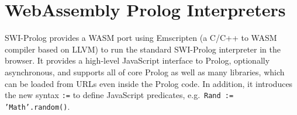 \documentclass{article}
\begin{document}
\section{WebAssembly Prolog Interpreters}

SWI-Prolog provides a WASM port \cite{swiprologwasm} using Emscripten (a C/C++ to WASM compiler based on LLVM) to run the standard SWI-Prolog interpreter in the browser. It provides a high-level JavaScript interface to Prolog, optionally asynchronous, and supports all of core Prolog as well as many libraries, which can be loaded from URLs even inside the Prolog code. In addition, it introduces the new syntax \texttt{:=} to define JavaScript predicates, e.g.\ \texttt{Rand := 'Math'.random()}.



\end{document}
